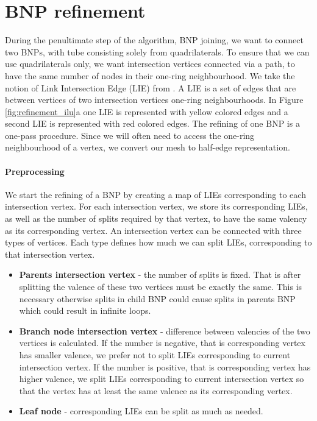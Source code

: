 \section{BNP refinement}\label{sec:bnp_sub}
During the penultimate step of the algorithm, BNP joining, we want to connect two BNPs, with tube consisting solely from quadrilaterals. To ensure that we can use quadrilaterals only, we want intersection vertices connected via a path, to have the same number of nodes in their one-ring neighbourhood. We take the notion of Link Intersection Edge (LIE) from \cite{sqm}. A LIE is a set of edges that are between vertices of two intersection vertices one-ring neighbourhoods. In Figure \ref{fig:refinement_ilu}a one LIE is represented with yellow colored edges and a second LIE is represented with red colored edges. The refining of one BNP is a one-pass procedure. Since we will often need to access the one-ring neighbourhood of a vertex, we convert our mesh to half-edge representation.

\paragraph{Preprocessing}
We start the refining of a BNP by creating a map of LIEs corresponding to each intersection vertex. For each intersection vertex, we store its corresponding LIEs, as well as the number of splits required by that vertex, to have the same valency as its corresponding vertex. An intersection vertex can be connected with three types of vertices. Each type defines how much we can split LIEs, corresponding to that intersection vertex.
\begin{itemize}
	\itemsep-0.25em 
	\item \textbf{Parents intersection vertex} - the number of splits is fixed. That is after splitting the valence of these two vertices must be exactly the same. This is necessary otherwise splits in child BNP could cause splits in parents BNP which could result in infinite loops.
	\item \textbf{Branch node intersection vertex} - difference between valencies of the two vertices is calculated. If the number is negative, that is corresponding vertex has smaller valence, we prefer not to split LIEs corresponding to current intersection vertex. If the number is positive, that is corresponding vertex has higher valence, we split LIEs corresponding to current intersection vertex so that the vertex has at least the same valence as its corresponding vertex.
	\item \textbf{Leaf node} - corresponding LIEs can be split as much as needed.
\end{itemize}

